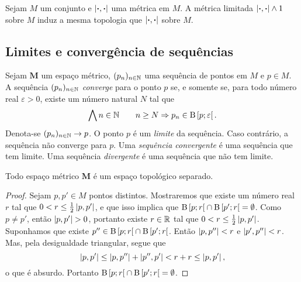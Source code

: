 \begin{exercise}
Sejam $M$ um conjunto e $\left\vert{\bm{\cdot}},{\bm{\cdot}}\right\vert$ uma métrica em $M$. A métrica limitada $\left\vert{\bm{\cdot}},{\bm{\cdot}}\right\vert \mathbin{\wedge} 1$ sobre $M$ induz a mesma topologia que $\left\vert{\bm{\cdot}},{\bm{\cdot}}\right\vert$ sobre $M$.
\end{exercise}

\subsection{Limites e convergência de sequências}

\begin{definition}
Sejam $\bm M$ um espaço métrico, $(p_n)_{n \in \mathbb{N}}$ uma sequência de pontos em $M$ e $p \in M$. A sequência $(p_n)_{n \in \mathbb{N}}$  \emph{converge} para o ponto $p$ se, e somente se, para todo número real $\varepsilon > 0$, existe um número natural $N$ tal que
	\begin{equation*}
	\bigwedge\nolimits n \in \mathbb{N} \qquad n \geq N \Rightarrow p_n \in \mathrm{B}\left[{p};{\varepsilon}\right[.
	\end{equation*}
Denota-se $(p_n)_{n \in \mathbb{N}} \rightarrow p$. O ponto $p$ é um \emph{limite} da sequência.  Caso contrário, a sequência não converge para $p$. Uma \emph{sequência convergente} é uma sequência que tem limite. Uma sequência \emph{divergente} é uma sequência que não tem limite.
\end{definition}

\begin{proposition}
Todo espaço métrico $\bm M$ é um espaço topológico separado.
\end{proposition}
\begin{proof}
Sejam $p,p' \in M$ pontos distintos. Mostraremos que existe um número real $r$ tal que $0 < r \leq \frac{1}{2} \left\vert{p},{p'}\right\vert$, e que isso implica que $\mathrm{B}\left[{p};{r}\right[ \cap \mathrm{B}\left[{p'};{r}\right[ = \emptyset$. Como $p \neq p'$, então $\left\vert{p},{p'}\right\vert > 0$, portanto existe $r \in \mathbb{R}$ tal que $0 < r \leq \frac{1}{2} \left\vert{p},{p'}\right\vert$. Suponhamos que existe $p'' \in \mathrm{B}\left[{p};{r}\right[ \cap \mathrm{B}\left[{p'};{r}\right[$. Então $\left\vert{p},{p''}\right\vert<r$ e $\left\vert{p'},{p''}\right\vert<r$. Mas, pela desigualdade triangular, segue que
	\begin{equation*}
	\left\vert{p},{p'}\right\vert \leq \left\vert{p},{p''}\right\vert + \left\vert{p''},{p'}\right\vert < r + r \leq \left\vert{p},{p'}\right\vert,
	\end{equation*}
o que é absurdo. Portanto $\mathrm{B}\left[{p};{r}\right[ \cap \mathrm{B}\left[{p'};{r}\right[ = \emptyset$.
\end{proof}

